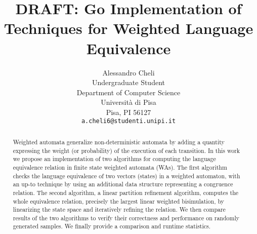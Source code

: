 \documentclass{article}
\title{DRAFT: Go Implementation of Techniques for Weighted Language Equivalence}
\author{
  Alessandro Cheli \\
  Undergraduate Student \\
  Department of Computer Science \\
  Università di Pisa\\
  Pisa, PI 56127 \\
  \texttt{a.cheli6@studenti.unipi.it} \\
}
\theoremstyle{plain}%
\theoremstyle{definition}
\theoremstyle{remark}
\begin{document}
\maketitle

\begin{abstract}
Weighted automata generalize non-deterministic automata by adding
a quantity expressing the weight (or probability) of the execution of each transition.
In this work we propose an implementation of two algorithms for computing
the language equivalence relation in finite state weighted automata (WAs). 
The first algorithm checks the language equivalence 
of two vectors (states) in a weighted automaton, 
with an up-to technique by using an additional
data structure representing a congruence relation.
The second algorithm, a
linear partition refinement algorithm, computes the 
whole equivalence relation, precisely the
largest linear weighted bisimulation,
by linearizing the state space and iteratively refining
the relation. 
We then compare results of the two algorithms to verify their correctness
and performance on randomly generated samples. 
We finally provide a comparison and runtime statistics.
\end{abstract}





























 

\appendix

%
\end{document}
